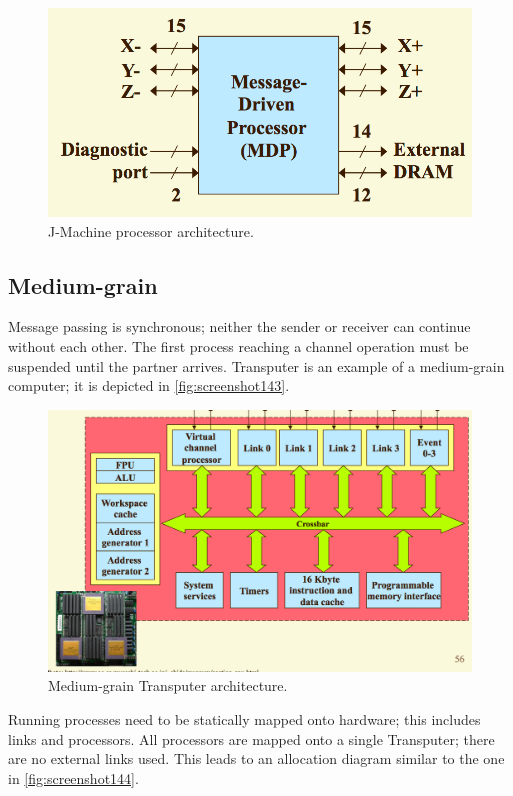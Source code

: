 \begin{figure}
\centering
\includegraphics[width=0.7\linewidth]{figures/screenshot142}
\caption{J-Machine processor architecture.}
\label{fig:screenshot142}
\end{figure}

\subsection{Medium-grain}
Message passing is synchronous; neither the sender or receiver can continue without each other. The first process reaching a channel operation must be suspended until the partner arrives. Transputer is an example of a medium-grain computer; it is depicted in \autoref{fig:screenshot143}.

\begin{figure}
\centering
\includegraphics[width=0.7\linewidth]{figures/screenshot143}
\caption{Medium-grain Transputer architecture.}
\label{fig:screenshot143}
\end{figure}

Running processes need to be statically mapped onto hardware; this includes links and processors. All processors are mapped onto a single Transputer; there are no external links used. This leads to an allocation diagram similar to the one in \autoref{fig:screenshot144}.

